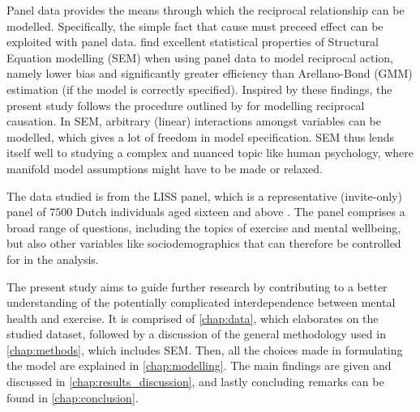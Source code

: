Panel data provides the means through which the reciprocal relationship can be modelled. Specifically, the simple fact
that cause must preceed effect can be exploited with panel data.
 find excellent statistical properties of Structural Equation modelling (SEM)
when using panel data to model reciprocal action, namely lower bias and significantly greater efficiency than Arellano-Bond
(GMM) estimation (if the model is correctly specified).
Inspired by these findings, the present study follows the procedure outlined by 
for modelling reciprocal causation.
In SEM, arbitrary (linear) interactions amongst variables can be modelled, which gives a lot of freedom in model
specification. SEM thus lends itself well to studying a complex and nuanced topic like human psychology,
where manifold model assumptions might have to be made or relaxed.

The data studied is from the LISS panel, which is a representative (invite-only) panel of $7500$ Dutch individuals aged
sixteen and above \cite{scherpenzeel2010liss}. The panel comprises a broad range of questions, including the topics of exercise
and mental wellbeing, but also other variables like sociodemographics that can therefore be controlled for in the analysis.

The present study aims to guide further research by contributing to a better understanding of the potentially
complicated interdependence between mental health and exercise.
It is comprised of \cref{chap:data}, which elaborates on the studied dataset, followed by a discussion of the
general methodology used in \cref{chap:methods}, which includes SEM.
Then, all the choices made in formulating the model are explained in \cref{chap:modelling}.
The main findings are given and discussed in \cref{chap:results_discussion},
and lastly concluding remarks can be found in \cref{chap:conclusion}.
